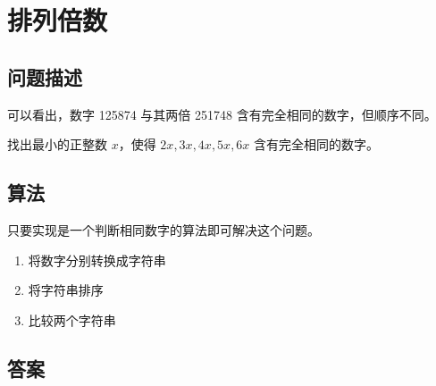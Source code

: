 \section{排列倍数}
\subsection{问题描述}
\begin{tcolorbox}
	可以看出，数字 125874 与其两倍 251748 含有完全相同的数字，但顺序不同。

	找出最小的正整数 $x$，使得 $2x, 3x, 4x, 5x, 6x$ 含有完全相同的数字。
\end{tcolorbox}

\subsection{算法}
只要实现是一个判断相同数字的算法即可解决这个问题。

\begin{enumerate}
	\item 将数字分别转换成字符串
	\item 将字符串排序
	\item 比较两个字符串
\end{enumerate}

\subsection{答案}
